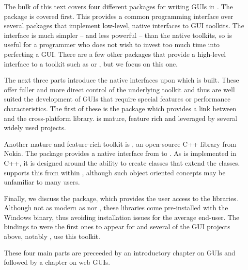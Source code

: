 
The bulk of this text covers four different packages for writing GUIs
in \R. The  package is covered first. This provides a
common programming interface over several \R\/ packages that implement
low-level, native interfaces to GUI toolkits. The 
interface is much simpler -- and less powerful -- than the native
toolkits, so is useful for a programmer who does not wish to invest
too much time into perfecting a GUI. There are a few other packages
that provide a high-level \R\/ interface to a toolkit such as
 or , but we focus on this one.


The next three parts introduce the native interfaces upon which
 is built. These offer fuller and more direct control of
the underlying toolkit and thus are well suited the development of GUIs
that require special features or performance characteristics.  The
first of these is the  package which provides a link
between \R\/ and the cross-platform \GTK\/ library. \GTK\/ is mature,
feature rich and leveraged by several widely used
projects. 

Another mature and feature-rich toolkit is \Qt, an open-source C++ library
from Nokia. The \R\/ package  provides a native interface
from \R\/ to \Qt.  As \Qt\/ is implemented in C++, it is designed
around the ability to create classes that extend the \Qt\/
classes.  supports this from within \R\/, although such
object oriented concepts may be unfamiliar to many \R\/ users.

Finally, we discuss the  package, which provides the \R\/
user access to the \TK\/ libraries. Although not as modern as \GTK\/
nor \Qt, these libraries come pre-installed with the Windows binary,
thus avoiding installation issues for the average end-user. The
bindings to \TK\/ were the first ones to appear for \R\/ and 
several of the GUI projects above, notably , use this
toolkit.

These four main parts are preceeded by an introductory chapter on GUIs
and followed by a chapter on web GUIs.

